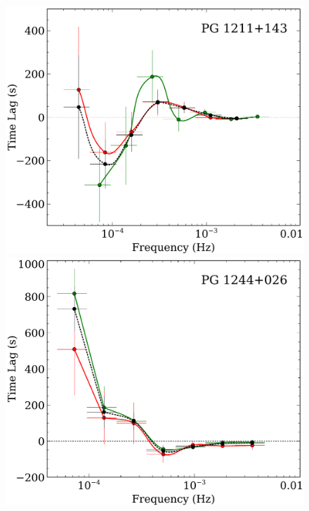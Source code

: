 \documentclass{article}
\begin{document}
\begin{figure}
\includegraphics[scale=0.4]{images/PG1211+143-lag-results-lo-hi-flux-FP.pdf} 
\includegraphics[scale=0.4]{images/PG1244+026-lag-results-lo-hi-flux-FP.pdf}\\
\vspace{0.5cm}

\end{figure}
\end{document}
